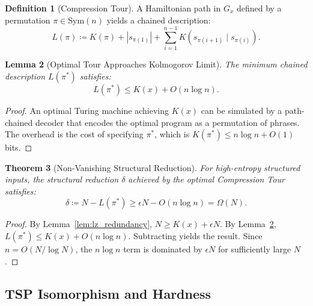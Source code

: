 \documentclass[12pt,a4paper]{article}
\theoremstyle{plain}
\newtheorem{theorem}{Theorem}[section]
\newtheorem{lemma}[theorem]{Lemma}
\theoremstyle{definition}
\newtheorem{definition}[theorem]{Definition}
\begin{document}
\begin{definition}[Compression Tour] \label{def:tour}
A Hamiltonian path in $G_x$ defined by a permutation $\pi \in \mathrm{Sym}(n)$ yields a 
chained description:
\begin{equation}
    L(\pi) \coloneqq K(\pi) + |s_{\pi(1)}| + \sum_{i=1}^{n-1} K(s_{\pi(i+1)} \mid s_{\pi(i)}).
\end{equation}
\end{definition}

\begin{lemma}[Optimal Tour Approaches Kolmogorov Limit] \label{lem:tour_bound}
The minimum chained description $L(\pi^*)$ satisfies:
\begin{equation}
    L(\pi^*) \le K(x) + O(n \log n).
\end{equation}
\end{lemma}
\begin{proof}
An optimal Turing machine achieving $K(x)$ can be simulated by a path-chained decoder that 
encodes the optimal program as a permutation of phrases. The overhead is the cost of 
specifying $\pi^*$, which is $K(\pi^*) \le n \log n + O(1)$ bits.
\end{proof}

\begin{theorem}[Non-Vanishing Structural Reduction] \label{thm:reduction}
For high-entropy structured inputs, the structural reduction $\delta$ achieved by the 
optimal Compression Tour satisfies:
\begin{equation}
    \delta \coloneqq N - L(\pi^*) \ge \epsilon N - O(n \log n) = \Omega(N).
\end{equation}
\end{theorem}
\begin{proof}
By Lemma~\ref{lem:lz_redundancy}, $N \ge K(x) + \epsilon N$. By Lemma~\ref{lem:tour_bound}, $L(\pi^*) \le 
K(x) + O(n \log n)$. Subtracting yields the result. Since $n = O(N / \log N)$, the $n \log n$ 
term is dominated by \(\epsilon N\) for sufficiently large $N$.
\end{proof}

\subsection{TSP Isomorphism and Hardness}
\end{document}

